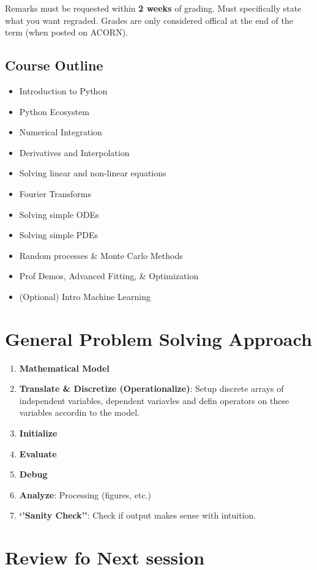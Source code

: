     Remarks must be requested within \textbf{2 weeks} of grading. Must specifically state what you want regraded. Grades are only considered offical at the end of the term (when posted on ACORN).

    \subsection{Course Outline}
        \begin{itemize}
            \item Introduction to Python
            \item Python Ecosystem
            \item Numerical Integration
            \item Derivatives and Interpolation
            \item Solving linear and non-linear equations
            \item Fourier Transforms
            \item Solving simple ODEs
            \item Solving simple PDEs
            \item Random processes \& Monte Carlo Methods
            \item Prof Demos, Advanced Fitting, \& Optimization
            \item (Optional) Intro Machine Learning
        \end{itemize}

\section{General Problem Solving Approach}
    \begin{enumerate}
        \item \textbf{Mathematical Model}
        \item \textbf{Translate \& Discretize (Operationalize)}: Setup discrete arrays of independent variables, dependent variavles and defin operators on these variables accordin to the model.
        \item \textbf{Initialize}
        \item \textbf{Evaluate}
        \item \textbf{Debug}
        \item \textbf{Analyze}: Processing (figures, etc.)
        \item \textbf{`'Sanity Check''}: Check if output makes sense with intuition.
    \end{enumerate}

\section{Review fo Next session}
